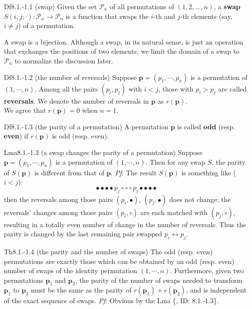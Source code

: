 \documentclass{article}
\begin{document}
\begin{Df}{Df8.1.-1.1 (swap)}
    Given the set $\mathcal{P}_n$ of all permutations of $(1,2,\dots,n)$, a \textbf{swap} $S(i,j; \cdot): \mathcal{P}_n\to\mathcal{P}_n$ is a function that swaps the $i$-th and $j$-th elements (say, $i\neq j$) of a permutation. 
\end{Df}

\begin{Rmk}{}
    \textcolor{Th}{A swap is a bijection.} Although a swap, in its natural sense, is just an operation that exchanges the positions of two elements, we limit the domain of a swap to $\mathcal{P}_n$ to normalize the discussion later.
\end{Rmk}

\begin{Df}{Df8.1.-1.2 (the number of reversals)}
    Suppose $\pmb{p} = (p_1, \cdots, p_n)$ is a permutation of $(1,\cdots,n)$. Among all the pairs $(p_i, p_j)$ with $i<j$, those with $p_i>p_j$ are called \textbf{reversals}. We denote the number of reversals in $\pmb{p}$ as $r(\pmb{p})$. \\
    We agree that $r(\pmb{p}) = 0$ when $n=1$.
\end{Df}

\begin{Df}{Df8.1.-1.3 (the parity of a permutation)}
    A permutation $\pmb{p}$ is called \textbf{odd} (resp. \textbf{even}) if $r(\pmb{p})$ is odd (resp. even). 
\end{Df}

\begin{Th}{Lma8.1.-1.3 (a swap changes the parity of a permutation)}
    Suppose $\pmb{p} = (p_1, \cdots, p_n)$ is a permutation of $(1,\cdots,n)$. Then for any swap $S$, the parity of $S(\pmb{p})$ is different from that of $\pmb{p}$.
    \tcblower
    \textit{Pf}: The result $S(\pmb{p})$ is something like ($i<j$):
    $$ \bullet\bullet\bullet\bullet p_j\circ\circ\circ p_i\bullet\bullet\bullet\bullet $$
    then the reversals among those pairs $(p_i,\bullet)$, $(p_j,\bullet)$ does not change; the reversals' changes among those pairs $(p_i, \circ)$ are each matched with $(p_j, \circ)$, resulting in a totally even number of change in the number of reversals. Thus the parity is changed by the last remaining pair swapped $p_i\leftrightarrow p_j$. 
\end{Th}

\begin{Th}{Th8.1.-1.4 (the parity and the number of swaps)}
    The odd (resp. even) permutations are exactly those which can be obtained by an odd (resp. even) number of swaps of the identity permutation $(1,\cdots,n)$. Furthermore, given two permutations $\pmb{p}_1$ and $\pmb{p}_2$, the parity of the number of swaps needed to transform $\pmb{p}_1$ to $\pmb{p}_2$ must be the same as the parity of $r(\pmb{p}_1)+r(\pmb{p}_2)$, and is independent of the exact sequence of swaps.
    \tcblower
    \textit{Pf}: Obvious by the Lma \{, ID: 8.1.-1.3\}.
\end{Th}
\end{document}
